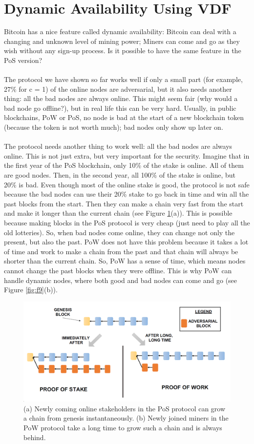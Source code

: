 \section{Dynamic Availability Using VDF}
Bitcoin has a nice feature called dynamic availability: Bitcoin can deal with a changing and unknown level of mining power; Miners can come and go as they wish without any sign-up process. Is it possible to have the same feature in the PoS version?\\\\
The protocol we have shown so far works well if only a small part (for example, 27\% for c = 1) of the online nodes are adversarial, but it also needs another thing: all the bad nodes are always online. This might seem fair (why would a bad node go offline?), but in real life this can be very hard. Usually, in public blockchains, PoW or PoS, no node is bad at the start of a new blockchain token (because the token is not worth much); bad nodes only show up later on.\\\\
The protocol needs another thing to work well: all the bad nodes are always online. This is not just extra, but very important for the security. Imagine that in the first year of the PoS blockchain, only 10\% of the stake is online. All of them are good nodes. Then, in the second year, all 100\% of the stake is online, but 20\% is bad. Even though most of the online stake is good, the protocol is not safe because the bad nodes can use their 20\% stake to go back in time and win all the past blocks from the start. Then they can make a chain very fast from the start and make it longer than the current chain (see Figure \ref{fig:l11_f9}(a)). This is possible because making blocks in the PoS protocol is very cheap (just need to play all the old lotteries). So, when bad nodes come online, they can change not only the present, but also the past. PoW does not have this problem because it takes a lot of time and work to make a chain from the past and that chain will always be shorter than the current chain. So, PoW has a sense of time, which means nodes cannot change the past blocks when they were offline. This is why PoW can handle dynamic nodes, where both good and bad nodes can come and go (see Figure \ref{fig:f9}(b)).
\begin{figure}[h!]
	\centering
	\includegraphics[width=0.7\linewidth]{Fig/11/F9}
	\caption{(a) Newly coming online stakeholders in the PoS protocol can grow a chain from genesis
		instantaneously. (b) Newly joined miners in the PoW protocol take a long time to grow such a chain
		and is always behind.}
	\label{fig:l11_f9}
\end{figure}
